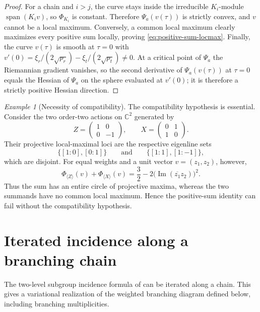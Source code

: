 \documentclass[10pt]{amsart}
\theoremstyle{remark}
\newtheorem{example}[theorem]{Example}
\DeclareMathOperator{\Span}{span}
\begin{document}
\begin{proof}
For a chain and $i>j$, the curve stays inside the irreducible $K_i$-module $\Span(K_i v)$, so
$\Phi_{K_i}$ is constant. Therefore $\Psi_a(v(\tau))$ is strictly convex, and $v$ cannot be a local
maximum. Conversely, a common local maximum clearly maximizes every positive sum locally, proving
\eqref{eq:positive-sum-locmax}. Finally, the curve $v(\tau)$ is smooth at $\tau=0$ with
$v'(0)=\xi_r/(2\sqrt{p_r})-\xi_t/(2\sqrt{p_t})\ne0$. At a critical point of $\Psi_a$ the Riemannian
gradient vanishes, so the second derivative of $\Psi_a(v(\tau))$ at $\tau=0$ equals the Hessian of
$\Psi_a$ on the sphere evaluated at $v'(0)$; it is therefore a strictly positive Hessian direction.
\end{proof}

\begin{example}[Necessity of compatibility]
\label{ex:necessity-of-compatibility}
The compatibility hypothesis is essential.
Consider the two order-two actions on $\mathbb{C}^2$
generated by
\[
 Z=
 \begin{pmatrix}
 1 & 0\\
 0 & -1
 \end{pmatrix},
 \qquad
 X=
 \begin{pmatrix}
 0 & 1\\
 1 & 0
 \end{pmatrix}.
\]
Their projective local-maximal loci are the respective
eigenline sets
\[
 \{[1:0],[0:1]\}
 \qquad\text{and}\qquad
 \{[1:1],[1:-1]\},
\]
which are disjoint.
For equal weights and a unit vector $v=(z_1,z_2)$, however,
\[
 \Phi_{\langle Z\rangle}(v)
 +
 \Phi_{\langle X\rangle}(v)
 =
 \frac{3}{2}
 -
 2\bigl(\operatorname{Im}(\overline{z_1}z_2)\bigr)^2.
\]
Thus the sum has an entire circle of projective maxima,
whereas the two summands have no common local maximum.
Hence the positive-sum identity can fail without
the compatibility hypothesis.
\end{example}

\section{Iterated incidence along a branching chain}\label{sec:bratteli}

The two-level subgroup incidence formula of \cite[Theorem~6]{HungKang2026} can be iterated
along a chain. This gives a variational realization of the weighted branching diagram defined below,
including branching multiplicities.
\end{document}
